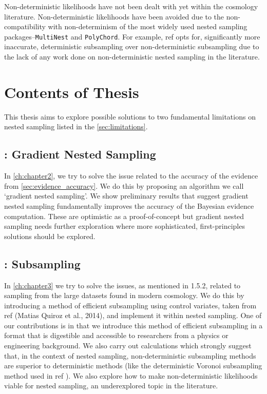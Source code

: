 Non-deterministic likelihoods have not been dealt with yet within the cosmology literature. Non-deterministic likelihoods have been avoided due to the non-compatibility with non-determinism of the most widely used nested sampling packages--\texttt{MultiNest} and \texttt{PolyChord}. For example, ref \cite{Mihaylov_2020} opts for, significantly more inaccurate, deterministic subsampling over non-deterministic subsampling due to the lack of any work done on non-deterministic nested sampling in the literature.

\section{Contents of Thesis}

This thesis aims to explore possible solutions to two fundamental limitations on nested sampling listed in the \cref{sec:limitations}.


\subsection*{: Gradient Nested Sampling}


In \cref{ch:chapter2}, we try to solve the issue related to the accuracy of the evidence from \cref{sec:evidence_accuracy}. We do this by proposing an algorithm we call `gradient nested sampling'. We show preliminary results that suggest gradient nested sampling fundamentally improves the accuracy of the Bayesian evidence computation. These are optimistic as a proof-of-concept but gradient nested sampling needs further exploration where more sophisticated, first-principles solutions should be explored.

\subsection*{: Subsampling}

In \cref{ch:chapter3} we try to solve the issues, as mentioned in 1.5.2, related to sampling from the large datasets found in modern cosmology. We do this by introducing a method of efficient subsampling using control variates, taken from ref \cite{Quiroz_2018} (Matias Quiroz et al., 2014), and implement it within nested sampling. One of our contributions is in that we introduce this method of efficient subsampling in a format that is digestible and accessible to researchers from a physics or engineering background. We also carry out calculations which strongly suggest that, in the context of nested sampling, non-deterministic subsampling methods are superior to deterministic methods (like the deterministic Voronoi subsampling method used in ref \cite{Mihaylov_2020}). We also explore how to make non-deterministic likelihoods viable for nested sampling, an underexplored topic in the literature.

